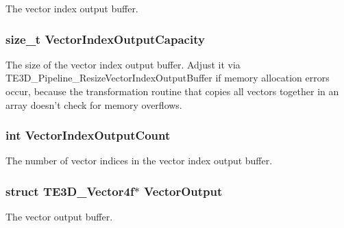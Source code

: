 The vector index output buffer. 

\hypertarget{struct_t_e3_d___pipeline_affb87c7664521d942273fcc22a2b715f}{
\subsubsection[{Vector\-Index\-Output\-Capacity}]{\setlength{\rightskip}{0pt plus 5cm}size\-\_\-t Vector\-Index\-Output\-Capacity}}\label{struct_t_e3_d___pipeline_affb87c7664521d942273fcc22a2b715f}
The size of the vector index output buffer. Adjust it via T\-E3\-D\-\_\-\-Pipeline\-\_\-\-Resize\-Vector\-Index\-Output\-Buffer if memory allocation errors occur, because the transformation routine that copies all vectors together in an array doesn't check for memory overflows. \hypertarget{struct_t_e3_d___pipeline_a26aaade63f941ff5fe6d8b310dc74c7f}{
\subsubsection[{Vector\-Index\-Output\-Count}]{\setlength{\rightskip}{0pt plus 5cm}int Vector\-Index\-Output\-Count}}\label{struct_t_e3_d___pipeline_a26aaade63f941ff5fe6d8b310dc74c7f}


The number of vector indices in the vector index output buffer. 

\hypertarget{struct_t_e3_d___pipeline_a484b514c3272f2ebd29fadb67c976cfb}{
\subsubsection[{Vector\-Output}]{\setlength{\rightskip}{0pt plus 5cm}struct {\bf T\-E3\-D\-\_\-\-Vector4f}$\ast$ Vector\-Output}}\label{struct_t_e3_d___pipeline_a484b514c3272f2ebd29fadb67c976cfb}


The vector output buffer. 

